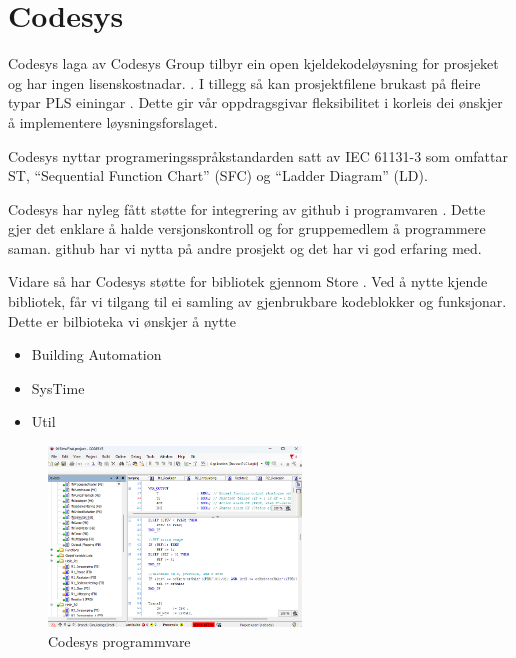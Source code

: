 \section{Codesys}
\thispagestyle{fancy}
\gls{Codesys} laga av \gls{Codesys} Group tilbyr ein open kjeldekodeløysning for prosjeket og har ingen lisenskostnadar. \citep{CodesysLisens}. 
I tillegg så kan prosjektfilene brukast på fleire typar PLS einingar \citep{CodesysPLS}. 
Dette gir vår oppdragsgivar fleksibilitet i korleis dei ønskjer å implementere løysningsforslaget.

\gls{Codesys} nyttar programeringsspråkstandarden satt av \gls{IEC} 61131-3 som omfattar \gls{ST}, ``Sequential Function Chart'' (\gls{SFC}) og ``Ladder Diagram'' (\gls{LD}). 

\gls{Codesys} har nyleg fått støtte for integrering av \gls{github} i programvaren \citep{CodesysGIT}. 
Dette gjer det enklare å halde versjonskontroll og for gruppemedlem å programmere saman. 
\gls{github} har vi nytta på andre prosjekt og det har vi god erfaring med.

Vidare så har \gls{Codesys} støtte for bibliotek gjennom  Store \citep{CodesysStore}. 
Ved å nytte kjende bibliotek, får vi tilgang til ei samling av gjenbrukbare kodeblokker og funksjonar.
Dette er bilbioteka vi ønskjer å nytte

 
\begin{itemize}
    \item {} Building Automation \citep{BuildingAutomation}
    \item SysTime \citep{DateAndTime}
    \item Util \citep{Util} \newline \newline
\end{itemize} 

\begin{figure}[htbp]
    \centering
    \includegraphics[width=0.6\textwidth]{Bilder/Codesys.png}
    \caption{Codesys programmvare}\label{fig:Codesys}
\end{figure}

\newpage
